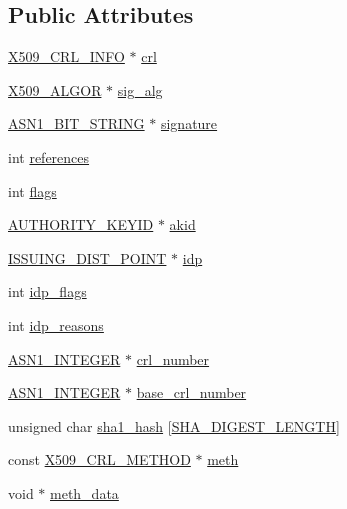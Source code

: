 \subsection*{Public Attributes}
\begin{DoxyCompactItemize}
\item 
\hyperlink{x509_8h_a1e216f160dc7df7dcd81665a2579c027}{X509\+\_\+\+C\+R\+L\+\_\+\+I\+N\+FO} $\ast$ \hyperlink{struct_x509__crl__st_a8f04f1fd2ba0193a216400aee5411825}{crl}
\item 
\hyperlink{ossl__typ_8h_aa2b6185e6254f36f709cd6577fb5022e}{X509\+\_\+\+A\+L\+G\+OR} $\ast$ \hyperlink{struct_x509__crl__st_a07ba02ffeeb926141b4aae2f0d03047b}{sig\+\_\+alg}
\item 
\hyperlink{ossl__typ_8h_af837aaa00e151b1e8773aea5a8fe1cc4}{A\+S\+N1\+\_\+\+B\+I\+T\+\_\+\+S\+T\+R\+I\+NG} $\ast$ \hyperlink{struct_x509__crl__st_a9ebc0cad86c7cb4527d94968fe16c608}{signature}
\item 
int \hyperlink{struct_x509__crl__st_aa143dabd3c77e3ef347835fc2f92b5a8}{references}
\item 
int \hyperlink{struct_x509__crl__st_a8feedb6a09ebbf7750cf2db8766d212b}{flags}
\item 
\hyperlink{ossl__typ_8h_a27c88725cd81ecf750f668814507bc8d}{A\+U\+T\+H\+O\+R\+I\+T\+Y\+\_\+\+K\+E\+Y\+ID} $\ast$ \hyperlink{struct_x509__crl__st_a01527fa4e6518449a4b656103664816f}{akid}
\item 
\hyperlink{ossl__typ_8h_a94e93ada81a13517c3c801f8cc36b960}{I\+S\+S\+U\+I\+N\+G\+\_\+\+D\+I\+S\+T\+\_\+\+P\+O\+I\+NT} $\ast$ \hyperlink{struct_x509__crl__st_ab5659c7166162f7688fbb8df843c822f}{idp}
\item 
int \hyperlink{struct_x509__crl__st_a63e54736632f7acfe2376d1022cdbdfe}{idp\+\_\+flags}
\item 
int \hyperlink{struct_x509__crl__st_a1e5c7e949f238d6937a45ff6e57738b9}{idp\+\_\+reasons}
\item 
\hyperlink{ossl__typ_8h_af4335399bf9774cb410a5e93de65998b}{A\+S\+N1\+\_\+\+I\+N\+T\+E\+G\+ER} $\ast$ \hyperlink{struct_x509__crl__st_a38d84a6c190dc370d74e145cd4faa8d4}{crl\+\_\+number}
\item 
\hyperlink{ossl__typ_8h_af4335399bf9774cb410a5e93de65998b}{A\+S\+N1\+\_\+\+I\+N\+T\+E\+G\+ER} $\ast$ \hyperlink{struct_x509__crl__st_a758731f9f2c7efcbf2d7e8c6e0b01278}{base\+\_\+crl\+\_\+number}
\item 
unsigned char \hyperlink{struct_x509__crl__st_a1040792ec929f92137cb677e58cc8e94}{sha1\+\_\+hash} \mbox{[}\hyperlink{sha_8h_a1a715db7b4403fe6c165e49a32f5fe3d}{S\+H\+A\+\_\+\+D\+I\+G\+E\+S\+T\+\_\+\+L\+E\+N\+G\+TH}\mbox{]}
\item 
const \hyperlink{ossl__typ_8h_abb64dd84972455ab16dc53699f157924}{X509\+\_\+\+C\+R\+L\+\_\+\+M\+E\+T\+H\+OD} $\ast$ \hyperlink{struct_x509__crl__st_a7fbfb8e62320e2a6275153c832c2ccd5}{meth}
\item 
void $\ast$ \hyperlink{struct_x509__crl__st_a409391d6ea1a661d0c27c84e26b9676b}{meth\+\_\+data}
\end{DoxyCompactItemize}


